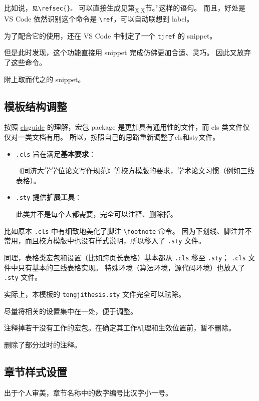 \documentclass[../Main/thesis.tex]{subfiles}
\begin{document}
比如说，\texttt{见\textbackslash{}refsec\{\}。}
可以直接生成见第\textsubscript{X.X}节。''这样的语句。 而且，好处是 VS Code 依然识别这个命令是 \texttt{\textbackslash{}ref}，可以自动联想到 label。

为了配合它的使用，还在 VS Code 中制定了一个 \texttt{tjref} 的 snippet。

但是此时发现，这个功能直接用 snippet 完成仿佛更加合适、灵巧。
因此又放弃了这些命令。

附上取而代之的 snippet。

\subsection{模板结构调整}

按照 \href{http://texdoc.net/texmf-dist/doc/latex/base/clsguide.pdf}{clsguide}
的理解，宏包 package 是更加具有通用性的文件，而 cls
类文件仅仅对一类文档有用。 所以，按照自己的思路重新调整了cls和sty文件。

\begin{itemize}
\item
  \texttt{.cls} 旨在满足\textbf{基本要求}：

  《同济大学学位论文写作规范》等校方模版的要求，学术论文习惯（例如三线表格）。
\item
  \texttt{.sty} 提供\textbf{扩展工具}：

  此类并不是每个人都需要，完全可以注释、删除掉。
\end{itemize}

比如原本 \texttt{.cls} 中有细致地美化了脚注
\texttt{\textbackslash{}footnote} 命令。
因为下划线、脚注并不常用，而且校方模版中也没有样式说明，所以移入了
\texttt{.sty} 文件。

同理，表格类宏包和设置（比如跨页长表格）基本都从 \texttt{.cls} 移至
\texttt{.sty}； \texttt{.cls} 文件中只有基本的三线表格实现。
特殊环境（算法环境，源代码环境）也放入了 \texttt{.sty} 文件。

实际上，本模板的 \texttt{tongjithesis.sty} 文件完全可以祛除。

尽量将相关的设置集中在一处，便于调整。

注释掉若干没有工作的宏包。在确定其工作机理和生效位置前，暂不删除。

删除了部分过时的注释。

\subsection{章节样式设置}

出于个人审美，章节名称中的数字编号比汉字小一号。
\end{document}
